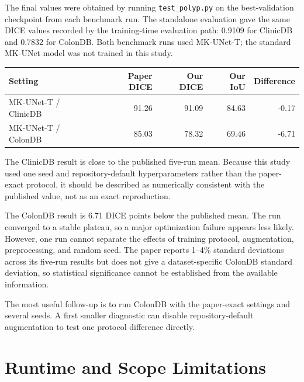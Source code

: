 \documentclass[10pt,a4paper]{article}
\begin{document}
The final values were obtained by running \texttt{test\_polyp.py} on the best-validation checkpoint from each benchmark run. The standalone evaluation gave the same DICE values recorded by the training-time evaluation path: 0.9109 for ClinicDB and 0.7832 for ColonDB. Both benchmark runs used MK-UNet-T; the standard MK-UNet model was not trained in this study.

\begin{table}[h]
\centering\small
\begin{tabular}{@{}lrrrr@{}}
\toprule
Setting & Paper DICE & Our DICE & Our IoU & Difference \\
\midrule
MK-UNet-T / ClinicDB & 91.26 & 91.09 & 84.63 & -0.17 \\
MK-UNet-T / ColonDB & 85.03 & 78.32 & 69.46 & -6.71 \\
\bottomrule
\end{tabular}
\end{table}

The ClinicDB result is close to the published five-run mean. Because this study used one seed and repository-default hyperparameters rather than the paper-exact protocol, it should be described as numerically consistent with the published value, not as an exact reproduction.

The ColonDB result is 6.71 DICE points below the published mean. The run converged to a stable plateau, so a major optimization failure appears less likely. However, one run cannot separate the effects of training protocol, augmentation, preprocessing, and random seed. The paper reports 1--4\% standard deviations across its five-run results but does not give a dataset-specific ColonDB standard deviation, so statistical significance cannot be established from the available information.

The most useful follow-up is to run ColonDB with the paper-exact settings and several seeds. A first smaller diagnostic can disable repository-default augmentation to test one protocol difference directly.

\section{Runtime and Scope Limitations}
\end{document}
